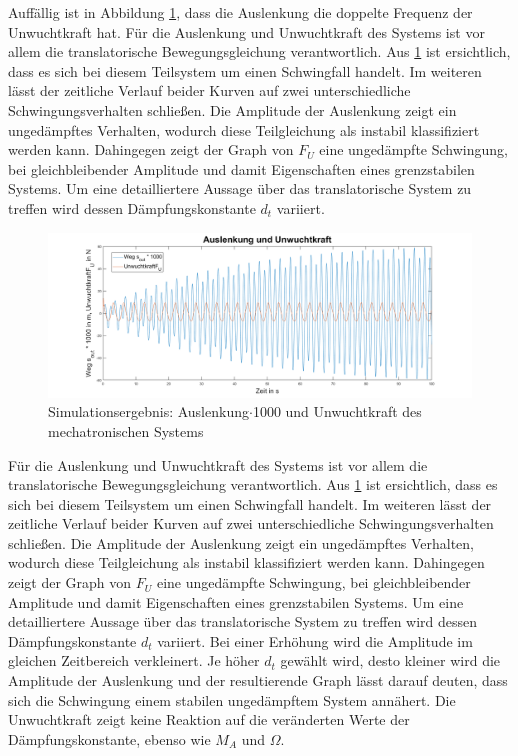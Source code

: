 Auffällig ist in Abbildung \ref{fig:StreckeundUnwuchtkraft}, dass die Auslenkung die doppelte Frequenz der Unwuchtkraft hat.
Für die Auslenkung und Unwuchtkraft des Systems ist vor allem die translatorische Bewegungsgleichung verantwortlich. Aus \ref{fig:StreckeundUnwuchtkraft} ist ersichtlich, dass es sich bei diesem Teilsystem um einen Schwingfall handelt. Im weiteren lässt der zeitliche Verlauf beider Kurven auf zwei unterschiedliche Schwingungsverhalten schließen. Die Amplitude der Auslenkung zeigt ein ungedämpftes Verhalten, wodurch diese Teilgleichung als instabil klassifiziert werden kann. Dahingegen zeigt der Graph von $F_U$ eine ungedämpfte Schwingung, bei gleichbleibender Amplitude und damit Eigenschaften eines grenzstabilen Systems. Um eine detailliertere Aussage über das translatorische System zu treffen wird dessen Dämpfungskonstante $d_t$ variiert.
\begin{figure}[hbt]
	\centering
	\includegraphics[width=1\linewidth]{Images/StreckeundUnwuchtkraft}
	\caption{Simulationsergebnis: Auslenkung$\cdot$1000 und Unwuchtkraft des mechatronischen Systems}
	\label{fig:StreckeundUnwuchtkraft}
\end{figure}
Für die Auslenkung und Unwuchtkraft des Systems ist vor allem die translatorische Bewegungsgleichung verantwortlich. Aus \ref{fig:StreckeundUnwuchtkraft} ist ersichtlich, dass es sich bei diesem Teilsystem um einen Schwingfall handelt. Im weiteren lässt der zeitliche Verlauf beider Kurven auf zwei unterschiedliche Schwingungsverhalten schließen. Die Amplitude der Auslenkung zeigt ein ungedämpftes Verhalten, wodurch diese Teilgleichung als instabil klassifiziert werden kann. Dahingegen zeigt der Graph von $F_U$ eine ungedämpfte Schwingung, bei gleichbleibender Amplitude und damit Eigenschaften eines grenzstabilen Systems. Um eine detailliertere Aussage über das translatorische System zu treffen wird dessen Dämpfungskonstante $d_t$ variiert.
Bei einer Erhöhung wird die Amplitude im gleichen Zeitbereich verkleinert. Je höher $d_t$ gewählt wird, desto kleiner wird die Amplitude der Auslenkung und der resultierende Graph lässt darauf deuten, dass sich die Schwingung einem stabilen ungedämpftem System annähert. Die Unwuchtkraft zeigt keine Reaktion auf die veränderten Werte der Dämpfungskonstante, ebenso wie $M_A$ und $\Omega$. \\ \\
